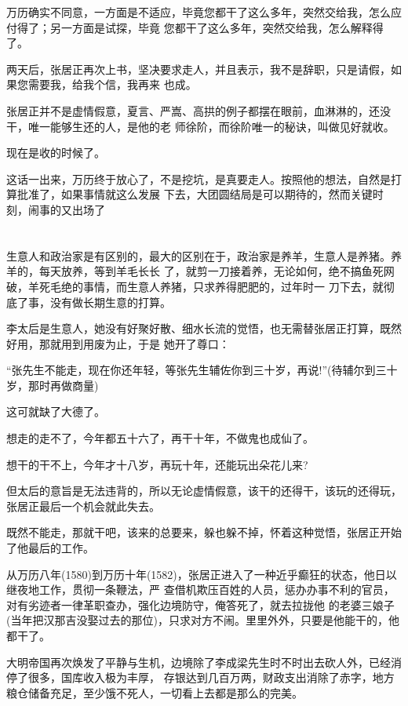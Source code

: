\documentclass[11pt,a4paper,onecolumn]{article}
\begin{document}
万历确实不同意，一方面是不适应，毕竟您都干了这么多年，突然交给我，怎么应付得了；另一方面是试探，毕竟
您都干了这么多年，突然交给我，怎么解释得了。

两天后，张居正再次上书，坚决要求走人，并且表示，我不是辞职，只是请假，如果您需要我，给我个信，我再来
也成。

张居正并不是虚情假意，夏言、严嵩、高拱的例子都摆在眼前，血淋淋的，还没干，唯一能够生还的人，是他的老
师徐阶，而徐阶唯一的秘诀，叫做见好就收。

现在是收的时候了。

这话一出来，万历终于放心了，不是挖坑，是真要走人。按照他的想法，自然是打算批准了，如果事情就这么发展
下去，大团圆结局是可以期待的，然而关键时刻，闹事的又出场了

\section[\thesection]{}

生意人和政治家是有区别的，最大的区别在于，政治家是养羊，生意人是养猪。养羊的，每天放养，等到羊毛长长
了，就剪一刀接着养，无论如何，绝不搞鱼死网破，羊死毛绝的事情，而生意人养猪，只求养得肥肥的，过年时一
刀下去，就彻底了事，没有做长期生意的打算。

李太后是生意人，她没有好聚好散、细水长流的觉悟，也无需替张居正打算，既然好用，那就用到用废为止，于是
她开了尊口：

``张先生不能走，现在你还年轻，等张先生辅佐你到三十岁，再说!''(待辅尔到三十岁，那时再做商量)

这可就缺了大德了。

想走的走不了，今年都五十六了，再干十年，不做鬼也成仙了。

想干的干不上，今年才十八岁，再玩十年，还能玩出朵花儿来?

但太后的意旨是无法违背的，所以无论虚情假意，该干的还得干，该玩的还得玩，张居正最后一个机会就此失去。

既然不能走，那就干吧，该来的总要来，躲也躲不掉，怀着这种觉悟，张居正开始了他最后的工作。

从万历八年(1580)到万历十年(1582)，张居正进入了一种近乎癫狂的状态，他日以继夜地工作，贯彻一条鞭法，严
查借机欺压百姓的人员，惩办办事不利的官员，对有劣迹者一律革职查办，强化边境防守，俺答死了，就去拉拢他
的老婆三娘子(当年把汉那吉没娶过去的那位)，只求对方不闹。里里外外，只要是他能干的，他都干了。

大明帝国再次焕发了平静与生机，边境除了李成梁先生时不时出去砍人外，已经消停了很多，国库收入极为丰厚，
存银达到几百万两，财政支出消除了赤字，地方粮仓储备充足，至少饿不死人，一切看上去都是那么的完美。
\end{document}
